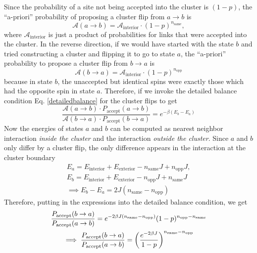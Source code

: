 \documentclass[../thesis_main.tex]{subfiles}
\begin{document}
Since the probability of a site not being accepted into the cluster is $(1-p)$, the ``a-priori'' probability of proposing a cluster flip from $a \to b$ is 
\begin{equation}
    \mathcal{A}(a \to b) = \mathcal{A}_\text{interior} \cdot (1-p)^{n_\text{same}},
\end{equation}
where $\mathcal{A}_\text{interior}$ is just a product of probabilities for links that were accepted into the cluster. In the reverse direction, if we would have started with the state $b$ and tried constructing a cluster and flipping it to go to state $a$, the ``a-priori'' probability to propose a cluster flip from $b \to a$ is 
\begin{equation}
    \mathcal{A}(b \to a) = \mathcal{A}_\text{interior} \cdot (1-p)^{n_\text{opp}}
\end{equation}
because in state $b$, the unaccepted but identical spins were exactly those which had the opposite spin in state $a$. Therefore, if we invoke the detailed balance condition Eq. \eqref{detailedbalance} for the cluster flips to get
\begin{equation}
    \frac{\mathcal{A}(a \to b) \cdot P_\text{accept}(a \to b)}{\mathcal{A}(b \to a) \cdot P_\text{accept}(b \to a)} = e^{-\beta(E_b - E_a)}
\end{equation}
Now the energies of states $a$ and $b$ can be computed as nearest neighbor interaction \textit{inside the cluster} and the interaction \textit{outside the cluster}. Since $a$ and $b$ only differ by a cluster flip, the only difference appears in the interaction at the cluster boundary
\begin{subequations}
    \begin{gather}
        E_a = E_\text{interior} + E_\text{exterior} - n_\text{same}J + n_\text{opp} J, \\
        E_b = E_\text{interior} + E_\text{exterior} - n_\text{opp}J + n_\text{same} J \\ 
        \implies E_b - E_a = 2J(n_\text{same} - n_\text{opp})
    \end{gather}
\end{subequations}
Therefore, putting in the expressions into the detailed balance condition, we get
\begin{subequations}
    \begin{gather}
        \frac{P_\text{accept}(b \to a)}{P_\text{accept}(a \to b)} = e^{-2\beta J(n_\text{same} - n_\text{opp})} (1-p)^{n_\text{opp} - n_\text{same}} \\
        \implies \frac{P_\text{accept}(b \to a)}{P_\text{accept}(a \to b)} = \qty(\frac{e^{-2\beta J}}{1-p})^{n_\text{same} - n_\text{opp}}
    \end{gather}
\end{subequations}
\end{document}
